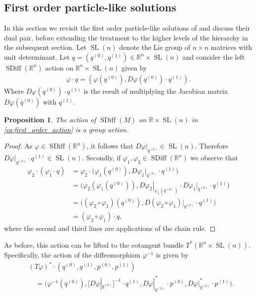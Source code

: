 \documentclass[12pt]{amsart}
\newcommand{\R}{\ensuremath{\mathbb{R}}}
\newtheorem{prop}[thm]{Proposition}
\DeclareMathOperator{\SDiff}{SDiff}
\DeclareMathOperator{\SL}{SL}
\begin{document}
\subsection{First order particle-like solutions}
\label{sec:first_order}
In this section we revisit the first order particle-like solutions of \cite{CotterHolmJacobsMeier2014} and discuss their dual pair, before extending the treatment to the higher levels of the hierarchy in the subsequent section. 
  Let $\SL(n)$ denote the Lie group of $n\times n$ matrices
  with unit determinant.
  Let $q = (q^{(0)}, q^{(1)}) \in \R^n \times \SL(n)$ and consider the left
  $\SDiff(\R^n)$ action on $\R^n \times \SL(n)$ given by
  \begin{align}
    \varphi \cdot q = (\varphi(q^{(0)} ) , D\varphi(q^{(0)} ) \cdot q^{(1)} ). \label{eq:first_order_action}
  \end{align}
  Where $D\varphi(q^{(0)} ) \cdot q^{(1)}$ is the result of multiplying
  the Jacobian matrix $D\varphi(q^{(0)} )$ with $q^{(1)}$.
  \begin{prop}
    The action of $\SDiff(M)$ on $\R \times \SL(n)$ in \eqref{eq:first_order_action} is a group action.
  \end{prop}
  \begin{proof}
    As $\varphi \in \SDiff(\R^n)$, it follows that $D\varphi |_{q^{(0)}} \in \SL(n)$.
    Therefore $D\varphi |_{q^{(0)}} \cdot q^{(1)} \in \SL(n)$.
    Secondly, if $\varphi_1,\varphi_2 \in \SDiff(\R^n)$ we observe that
    \begin{align*}
      \varphi_2 \cdot (\varphi_1 \cdot q)
      &= \varphi_2 \cdot \big(\varphi_1(q^{(0)} ) , D\varphi_1 |_{q^{(0)}} \cdot q^{(1)} \big) \\
      &= \big(\varphi_2(\varphi_1(q^{(0)} )) , \left. D\varphi_2 \right|_{\varphi_1( q^{(0)} )} \cdot D\varphi_1 |_{ q^{(0)} } \cdot q^{(1)} \big) \\
      &= \big( (\varphi_2 \circ \varphi_1)(q^{(0)} ) , D( \varphi_2 \circ \varphi_1)|_{q^{(0)} } \cdot q^{(1)} \big) \\
      &= (\varphi_2 \circ \varphi_1) \cdot q,
    \end{align*}
    where the second and third lines are applications of the chain rule.
  \end{proof}
  As before, this action can be lifted to the cotangent bundle $T^*(\R^n \times \SL(n))$.  Specifically, 
  the action of the diffeomorphism $\varphi^{-1}$ is given by
  \begin{align*}
    & (T\varphi)^* \cdot ( q^{(0)} , q^{(1)}  , p^{(0)} , p^{(1)} ) \\
    &\quad = \big( \varphi^{-1}(q^{(0)})  , [D\varphi|_{q^{(0)}}]^{-1} \cdot q^{(1)} , D\varphi|_{q^{(0)}}^* \cdot p^{(0)} , D\varphi|_{q^{(0)}}^* \cdot p^{(1)} \big).
  \end{align*}
\end{document}
